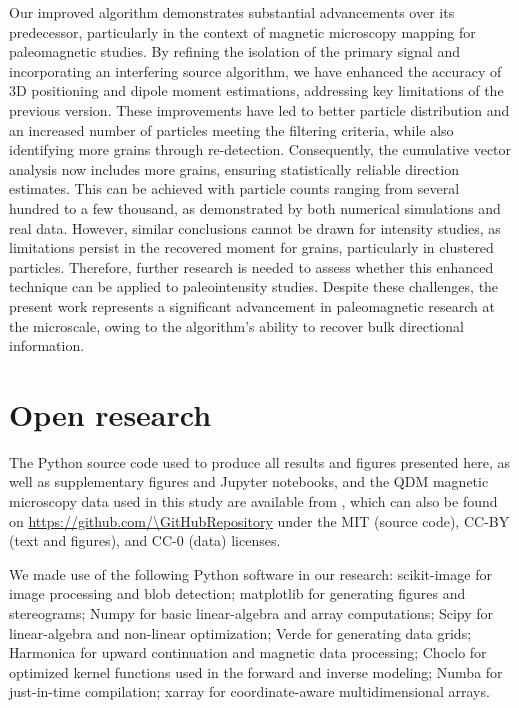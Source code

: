 Our improved algorithm demonstrates substantial advancements over its predecessor, particularly in the context of magnetic microscopy mapping for paleomagnetic studies. By refining the isolation of the primary signal and incorporating an interfering source algorithm, we have enhanced the accuracy of 3D positioning and dipole moment estimations, addressing key limitations of the previous version. These improvements have led to better particle distribution and an increased number of particles meeting the filtering criteria, while also identifying more grains through re-detection. Consequently, the cumulative vector analysis now includes more grains, ensuring statistically reliable direction estimates. This can be achieved with particle counts ranging from several hundred to a few thousand, as demonstrated by both numerical simulations and real data. However, similar conclusions cannot be drawn for intensity studies, as limitations persist in the recovered moment for grains, particularly in clustered particles. Therefore, further research is needed to assess whether this enhanced technique can be applied to paleointensity studies. Despite these challenges, the present work represents a significant advancement in paleomagnetic research at the microscale, owing to the algorithm's ability to recover bulk directional information.



\section{Open research}

The Python source code used to produce all results and figures presented here, as well as supplementary figures and Jupyter notebooks, and the QDM magnetic microscopy data used in this study are available from \citet{figshare}, which can also be found on \url{https://github.com/\GitHubRepository} under the MIT (source code), CC-BY (text and figures), and CC-0 (data) licenses.

We made use of the following Python software in our research:
scikit-image \citep{VanderWalt2014} for image processing and blob detection;
matplotlib \citep{Hunter2007} for generating figures and stereograms;
Numpy \citep{Harris2020} for basic linear-algebra and array computations;
Scipy \citep{2020SciPy-NMeth} for linear-algebra and non-linear optimization;
Verde \citep{verde2018} for generating data grids;
Harmonica \citep{harmonica2020} for upward continuation and magnetic data processing;
Choclo \citep{choclo2022} for optimized kernel functions used in the
forward and inverse modeling;
Numba \citep{lam2015numba} for just-in-time compilation;
xarray \citep{hoyer2017xarray} for coordinate-aware multidimensional arrays.

